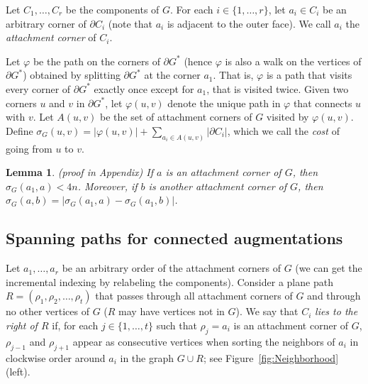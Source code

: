 \documentclass{patmorin}
\newcommand{\appendixproof}{(proof in Appendix)\xspace}
\newtheorem{lemma}[theorem]{Lemma}
\begin{document}
Let $C_1, \ldots, C_r$ be the components of $G$.
For each $i\in \{1,\dots,r\}$, let $a_i\in C_i$ be an arbitrary corner of $\partial C_i$ (note that $a_i$ is adjacent to the outer face).
We call $a_i$ the \emph{attachment corner} of $C_i$.

Let $\varphi$ be the path on the corners of $\partial G^*$ (hence $\varphi$ is also a walk on the vertices of $\partial G^*$) obtained by splitting $\partial G^*$ at the corner $a_1$. That is, $\varphi$ is a path that visits every corner of $\partial G^*$ exactly once except for $a_1$, that is visited twice.
Given two corners $u$ and $v$ in $\partial G^*$, let $\varphi(u,v)$ denote
the unique path in $\varphi$ that connects $u$ with $v$. Let $A(u,v)$ be
the set of attachment corners of $G$ visited by $\varphi(u,v)$. Define
    $ \sigma_G(u,v) = |\varphi(u,v)| + \sum_{a_i\in A(u,v)}|\partial C_i|$,
which we call the \emph{cost} of going from $u$ to $v$. 

\begin{lemma}\label{lemma:Contained in integer grid}\appendixproof
  If $a$ is an attachment corner of $G$, then $\sigma_G(a_1, a) < 4n$. Moreover, if $b$ is another attachment corner of $G$, then
  $\sigma_G(a, b) =  |\sigma_G(a_1, a)- \sigma_G(a_1, b)|$.
\end{lemma}
\vspace{-.1in}
\subsection{Spanning paths for connected augmentations}\label{section:Spanning paths for connected augmentations}
Let $a_1, \ldots, a_r$ be an arbitrary order of the attachment corners of $G$ (we can get the incremental indexing by relabeling the components).
Consider a plane path $R = (\rho_1, \rho_2, \ldots, \rho_t)$ that passes through all attachment corners of $G$ and through no other vertices of $G$ ($R$ may have vertices not in $G$). We say that $C_i$ {\em lies to the right of $R$} if, for each $j\in\{1,\ldots,t\}$ such that $\rho_j=a_i$ is an attachment corner of $G$, $\rho_{j-1}$ and $\rho_{j+1}$ appear as consecutive vertices when sorting the neighbors of $a_i$ in clockwise order around $a_i$ in the graph $G\cup R$; see Figure~\ref{fig:Neighborhood} (left).
\end{document}
